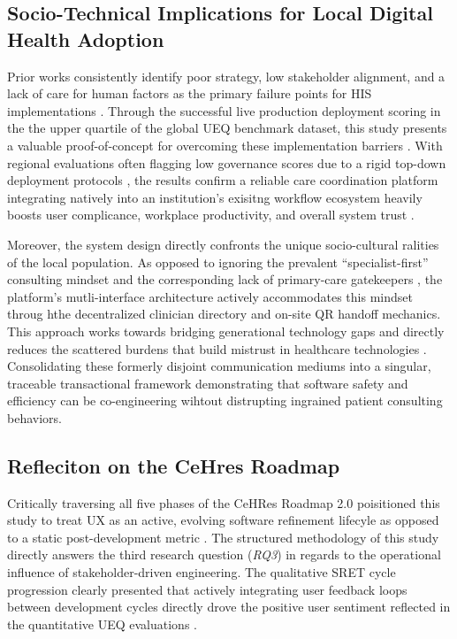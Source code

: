 \documentclass[manuscript, screen, review]{acmart}
\begin{document}
\subsection{Socio-Technical Implications for Local Digital Health Adoption}
\label{sub:imps_local_health}
Prior works consistently identify poor strategy, low stakeholder alignment, and a lack of care for human factors as the primary failure points for HIS implementations \cite{sucaldito_2025_challenges,garcia_2021_health}. Through the successful live production deployment scoring in the the upper quartile of the global UEQ benchmark dataset, this study presents a valuable proof-of-concept for overcoming these implementation barriers \cite{hinderks_user,schrepp_2023_user}. With regional evaluations often flagging low governance scores due to a rigid top-down deployment protocols \cite{sucaldito_2025_challenges}, the results confirm a reliable care coordination platform integrating natively into an institution's exisitng workflow ecosystem heavily boosts user complicance, workplace productivity, and overall system trust \cite{libadia_2025_development,oconnor_2016_understanding}. 

Moreover, the system design directly confronts the unique socio-cultural ralities of the local population. As opposed to ignoring the prevalent ``specialist-first'' consulting mindset and the corresponding lack of primary-care gatekeepers \cite{Lajeunesse2012}, the platform's mutli-interface architecture actively accommodates this mindset throug hthe decentralized clinician directory and on-site QR handoff mechanics. This approach works towards bridging generational technology gaps and directly reduces the scattered burdens that build mistrust in healthcare technologies \cite{livieri_2025_the}. Consolidating these formerly disjoint communication mediums into a singular, traceable transactional framework demonstrating that software safety and efficiency can be co-engineering wihtout distrupting ingrained patient consulting behaviors. 
\subsection{Refleciton on the CeHres Roadmap}
\label{sub:ceh_reflection}
Critically traversing all five phases of the CeHRes Roadmap 2.0 poisitioned this study to treat UX as an active, evolving software refinement lifecyle as opposed to a static post-development metric \cite{Kip2025CeHRes,ganjali_2024_ivrs}. The structured methodology of this study directly answers the third research question (\textit{RQ3}) in regards to the operational influence of stakeholder-driven engineering. The qualitative SRET cycle progression clearly presented that actively integrating user feedback loops between development cycles directly drove the positive user sentiment reflected in the quantitative UEQ evaluations \cite{lewis2012usability,schrepp_2023_user}. 
\end{document}
